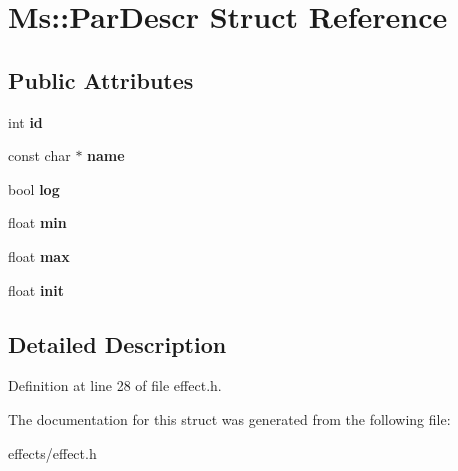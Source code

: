 \hypertarget{struct_ms_1_1_par_descr}{}\section{Ms\+:\+:Par\+Descr Struct Reference}
\label{struct_ms_1_1_par_descr}
\subsection*{Public Attributes}
\begin{DoxyCompactItemize}
\item 
\mbox{\label{struct_ms_1_1_par_descr_a8579e0ae2f09539a60e8434fb5e66743}} 
int {\bfseries id}
\item 
\mbox{\label{struct_ms_1_1_par_descr_a3520ee20e9d3a2774d8e39bc45a723ba}} 
const char $\ast$ {\bfseries name}
\item 
\mbox{\label{struct_ms_1_1_par_descr_ad7079ba9b96b609fdb61317df8f74f99}} 
bool {\bfseries log}
\item 
\mbox{\label{struct_ms_1_1_par_descr_a2375eb4aa1524f0704790080e4d3931e}} 
float {\bfseries min}
\item 
\mbox{\label{struct_ms_1_1_par_descr_acc447151db4a557d408fa5afdf8b4eda}} 
float {\bfseries max}
\item 
\mbox{\label{struct_ms_1_1_par_descr_a27497651448617d5581fe7aa0608b70b}} 
float {\bfseries init}
\end{DoxyCompactItemize}


\subsection{Detailed Description}


Definition at line 28 of file effect.\+h.



The documentation for this struct was generated from the following file\+:\begin{DoxyCompactItemize}
\item 
effects/effect.\+h\end{DoxyCompactItemize}
